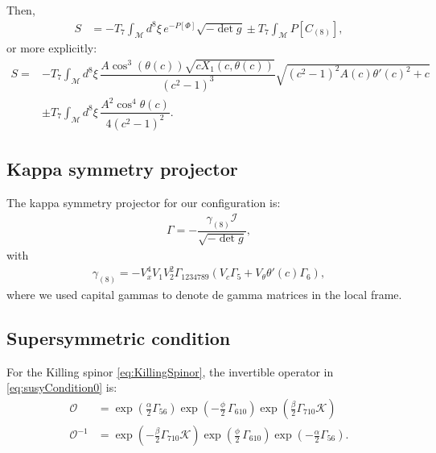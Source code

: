 Then,
\begin{align}
 S & = -T_7 \int_\mathcal{M} d^8\xi \, e^{-P[\Phi] } \sqrt{-\det g} \pm
 T_7\int _\mathcal{M} P[C_{(8)}],
\end{align}
or more explicitly:
\begin{align}\label{eq:ActionWithTheta'}
 S = & -T_7 \int_\mathcal{M} d^8\xi \, \dfrac{A \cos^3(\theta (c)) \sqrt{c X_1(c, \theta(c))}}{\left(c^2-1\right)^3} \sqrt{\left(c^2-1\right)^2 A(c) \theta '(c)^2+c}\\
 &\pm
 T_7\int _\mathcal{M} d^8\xi \, \dfrac{A^2 \cos^4\theta(c)}{4 \left(c^2-1\right)^2}.
\end{align}



\subsection{Kappa symmetry projector}

The kappa symmetry projector for our configuration is:
\begin{align}
\Gamma = - \dfrac{ \gamma_{(8)} \mathcal{I} }{\sqrt{-\det g}},
\end{align}
with
\begin{align}
 \gamma_{(8)} = - V_x^4 V_1 V_2^2 \Gamma_{1 2 3 4 7 8 9}( V_c \Gamma_5 +  V_{\theta} \theta'(c) \Gamma_6), 
\end{align}
where we used capital gammas to denote de gamma matrices in the local frame. 


\subsection{Supersymmetric condition}

For the Killing spinor \eqref{eq:KillingSpinor}, the invertible operator in \eqref{eq:susyCondition0} is:
\begin{align}
 \mathcal{O} &= \exp{\left(\frac{\alpha}{2}\Gamma_{56} \right)} \exp{\left(-\frac{\phi}{2}\, \Gamma_{610} \right)} \exp{\left(\frac{\beta}{2}\Gamma_{710} \mathcal{K} \right)} \\
 \mathcal{O}^{-1} &=  \exp{\left(-\frac{\beta}{2}\Gamma_{710} \mathcal{K} \right)} 
 \exp{\left(\frac{\phi}{2}\, \Gamma_{610} \right)} 
 \exp{\left(-\frac{\alpha}{2}\Gamma_{56} \right)}.
\end{align}



